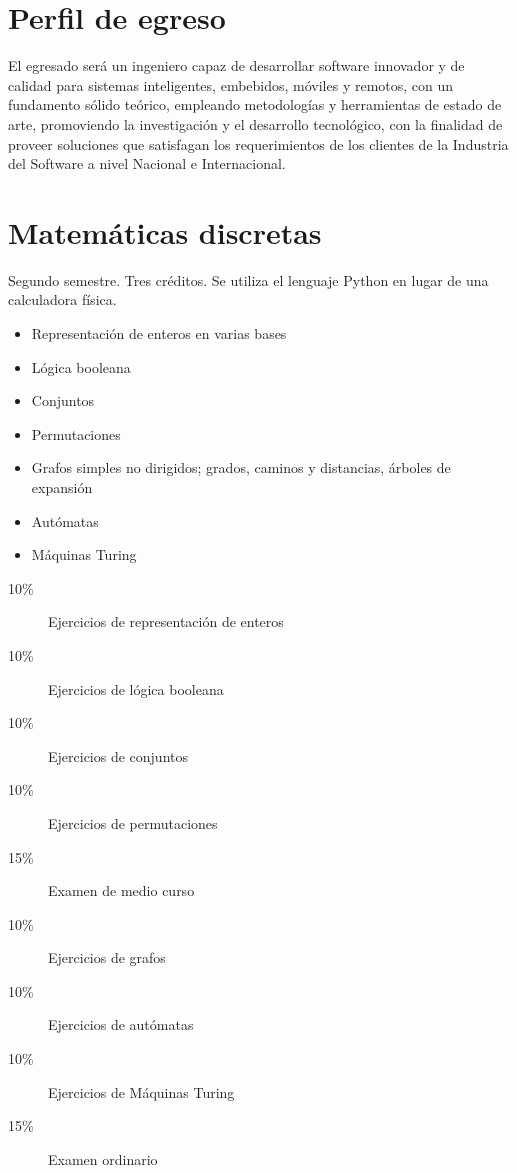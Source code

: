 \documentclass{article}
\begin{document}
\begin{multicols}{4}

\section*{Perfil de egreso}

El egresado ser\'{a} un ingeniero capaz de desarrollar software innovador
y de calidad para sistemas inteligentes, embebidos, m\'{o}viles y remotos,
con un fundamento s\'{o}lido te\'{o}rico, empleando metodolog\'{i}as y
herramientas de estado de arte, promoviendo la investigaci\'{o}n y el
desarrollo tecnol\'{o}gico, con la finalidad de proveer soluciones que
satisfagan los requerimientos de los clientes de la Industria del
Software a nivel Nacional e Internacional.

\vfill\null \columnbreak

\hypertarget{md}{\section*{Matem\'{a}ticas discretas}}

Segundo semestre. Tres cr\'{e}ditos. Se utiliza el lenguaje Python en
lugar de una calculadora f\'{i}sica.

\begin{itemize}
\item{Representaci\'{o}n de enteros en varias bases}
\item{L\'{o}gica booleana}
\item{Conjuntos}
\item{Permutaciones}  
\item{Grafos simples no dirigidos; grados, caminos y distancias, \'{a}rboles de expansi\'{o}n}
\item{Aut\'{o}matas}
\item{M\'{a}quinas Turing}
\end{itemize}

\begin{description}
\item[10\%]{Ejercicios de representaci\'{o}n de enteros}
\item[10\%]{Ejercicios de l\'{o}gica booleana}
\item[10\%]{Ejercicios de conjuntos}
\item[10\%]{Ejercicios de permutaciones}
\item[15\%]{Examen de medio curso}
\item[10\%]{Ejercicios de grafos}
\item[10\%]{Ejercicios de aut\'{o}matas}
\item[10\%]{Ejercicios de M\'{a}quinas Turing}        
\item[15\%]{Examen ordinario}
\end{description}


\end{multicols}
\end{document}
